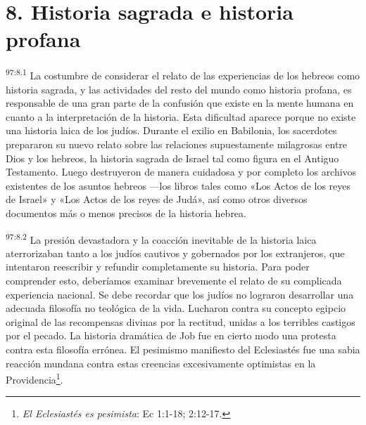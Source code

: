 \section*{8. Historia sagrada e historia profana}
\par
\textsuperscript{97:8.1} La costumbre de considerar el relato de las experiencias de los hebreos como historia sagrada, y las actividades del resto del mundo como historia profana, es responsable de una gran parte de la confusión que existe en la mente humana en cuanto a la interpretación de la historia. Esta dificultad aparece porque no existe una historia laica de los judíos. Durante el exilio en Babilonia, los sacerdotes prepararon su nuevo relato sobre las relaciones supuestamente milagrosas entre Dios y los hebreos, la historia sagrada de Israel tal como figura en el Antiguo Testamento. Luego destruyeron de manera cuidadosa y por completo los archivos existentes de los asuntos hebreos ---los libros tales como «Los Actos de los reyes de Israel» y «Los Actos de los reyes de Judá», así como otros diversos documentos más o menos precisos de la historia hebrea.

\par
\textsuperscript{97:8.2} La presión devastadora y la coacción inevitable de la historia laica aterrorizaban tanto a los judíos cautivos y gobernados por los extranjeros, que intentaron reescribir y refundir completamente su historia. Para poder comprender esto, deberíamos examinar brevemente el relato de su complicada experiencia nacional. Se debe recordar que los judíos no lograron desarrollar una adecuada filosofía no teológica de la vida. Lucharon contra su concepto egipcio original de las recompensas divinas por la rectitud, unidas a los terribles castigos por el pecado. La historia dramática de Job fue en cierto modo una protesta contra esta filosofía errónea. El pesimismo manifiesto del Eclesiastés fue una sabia reacción mundana contra estas creencias excesivamente optimistas en la Providencia\footnote{\textit{El Eclesiastés es pesimista}: Ec 1:1-18; 2:12-17.}.

